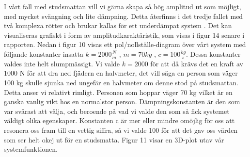 \documentclass[10pt,a4paper]{article}
\begin{document}
I vårt fall med studsmattan vill vi gärna skapa så hög amplitud ut som möjligt, med mycket svängning och lite dämpning. Detta återfinns i det tredje fallet med två komplexa rötter och brukar kallas för ett underdämpat system \cite{polesAndZeros}. Det kan visualiseras grafiskt i form av amplitudkaraktäristik, som visas i figur 14 senare i rapporten. Nedan i figur 10 visas ett pol/nollställe-diagram över vårt system med följande konstanter insatta $k=2000\frac{N}{m}$ , $m=70kg$ , $c=100\frac{kg}{s}$. Dessa konstanter valdes inte helt slumpmässigt. Vi valde $k = 2000$ för att då krävs det en kraft av 1000 N för att dra ned fjädern en halvmeter, det vill säga en person som väger 100 kg skulle sjunka ned ungefär en halvmeter om denne stod på studsmattan. Detta anser vi relativt rimligt. Personen som hoppar väger 70 kg vilket är en ganska vanlig vikt hos en normalstor person. Dämpningskonstanten är den som var svårast att välja, och beroende på vad vi valde den som så fick systemet väldigt olika egenskaper. Konstanten c är mer eller mindre omöjlig för oss att resonera oss fram till en vettig siffra, så vi valde 100 för att det gav oss värden som ser helt okej ut för en studsmatta. Figur 11 visar en 3D-plot utav vår systemfunktionen.
\end{document}
